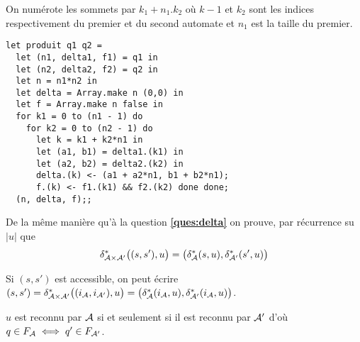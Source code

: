 \begin{Exercise}
On numérote les sommets par $k_1 + n_1.k_2$ où $k-1$ et $k_2$ sont les indices respectivement du premier et du second automate et $n_1$ est la taille du premier.
\begin{lstlisting}
let produit q1 q2 =
  let (n1, delta1, f1) = q1 in
  let (n2, delta2, f2) = q2 in
  let n = n1*n2 in
  let delta = Array.make n (0,0) in
  let f = Array.make n false in
  for k1 = 0 to (n1 - 1) do
    for k2 = 0 to (n2 - 1) do
      let k = k1 + k2*n1 in
      let (a1, b1) = delta1.(k1) in
      let (a2, b2) = delta2.(k2) in
      delta.(k) <- (a1 + a2*n1, b1 + b2*n1);
      f.(k) <- f1.(k1) && f2.(k2) done done;
  (n, delta, f);;
\end{lstlisting}
\end{Exercise}
\begin{Exercise}
De la même manière qu'à la question {\bf \ref{ques:delta}} on prouve, par récurrence su $|u|$ que
\[\delta_{{\cal A}\times {\cal A}'}^*\bigl((s, s'), u\bigr) = \bigl(\delta_{\cal A}^*(s, u), \delta_{{\cal A}'}^*(s', u)\bigr)\]

Si $(s, s')$ est accessible, on peut écrire $(s, s') = \delta_{{\cal A}\times {\cal A}'}^*\bigl((i_{\cal A}, i_{{\cal A}'}), u\bigr) = \bigl(\delta_{\cal A}^*(i_{\cal A}, u), \delta_{{\cal A}'}^*(i_{\cal A}, u)\bigr)$.

$u$ est reconnu par ${\cal A}$ si et seulement si il est reconnu par ${\cal A}'$ d'où $q\in F_{\cal A} \iff q'\in F_{{\cal A} '}$.
\end{Exercise}
